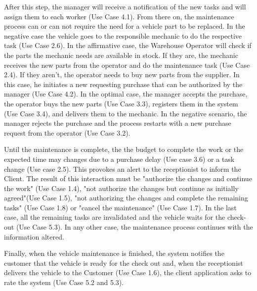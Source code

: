 After this step, the manager will receive a notification of the new tasks and will assign them to each worker (Use Case 4.1).
From there on, the maintenance process can or can not require the need for a vehicle part to be replaced. 
In the negative case the vehicle goes to the responsible mechanic to do the respective task (Use Case 2.6). 
In the affirmative case, the Warehouse Operator will check if the parts the mechanic needs are available in stock. 
If they are, the mechanic receives the new parts from the operator and do the maintenance task (Use Case 2.4). 
If they aren't, the operator needs to buy new parts from the supplier. 
In this case, he initiates a new requesting purchase that can be authorized by the manager (Use Case 4.2). 
In the optimal case, the manager accepts the purchase, the operator buys the new parts (Use Case 3.3), registers them in the system (Use Case 3.4), and delivers them to the mechanic. 
In the negative scenario, the manager rejects the purchase and the process restarts with a new purchase request from the operator (Use Case 3.2).    

Until the maintenance is complete, the the budget to complete the work or the expected time may changes due to a purchase delay (Use case 3.6) or a task change (Use case 2.5). This provokes an alert to the receptionist to inform the Client. 
The result of this interaction must be "authorize the changes and continue the work" (Use Case 1.4), "not authorize the changes but continue as initially agreed"(Use Case 1.5), "not authorizing the changes and complete the remaining tasks" (Use Case 1.8) or "cancel the maintenance" (Use Case 1.7).
In the last case, all the remaining tasks are invalidated and the vehicle waits for the check-out (Use Case 5.3). 
In any other case, the maintenance process continues with the information altered.

Finally, when the vehicle maintenance is finished, the system notifies the customer that the vehicle is ready for the check out and, when the receptionist delivers the vehicle to the Customer (Use Case 1.6), the client application asks to rate the system (Use Case 5.2 and 5.3).

